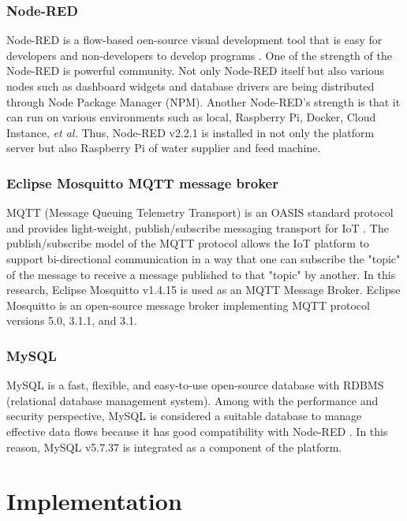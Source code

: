 \documentclass[conference]{IEEEtran}
\begin{document}
\subsubsection{Node-RED}
Node-RED is a flow-based oen-source visual development tool that is easy for developers and non-developers to develop programs \cite{b17}.
One of the strength of the Node-RED is powerful community. Not only Node-RED itself but also various nodes such as dashboard widgets and database drivers are being distributed through Node Package Manager (NPM).
Another Node-RED’s strength is that it can run on various environments such as local, Raspberry Pi, Docker, Cloud Instance, \textit{et al.} Thus, Node-RED v2.2.1 is installed in not only the platform server but also Raspberry Pi of water supplier and feed machine.

\subsubsection{Eclipse Mosquitto MQTT message broker}
MQTT (Message Queuing Telemetry Transport) is an OASIS standard protocol and provides light-weight, publish/subscribe messaging transport for IoT \cite{b9}.
The publish/subscribe model of the MQTT protocol allows the IoT platform to support bi-directional communication in a way that one can subscribe the "topic" of the message to receive a message published to that "topic" by another.
In this research, Eclipse Mosquitto v1.4.15 is used as an MQTT Message Broker.
Eclipse Mosquitto is an open-source message broker implementing MQTT protocol versions 5.0, 3.1.1, and 3.1\cite{b20}. 

\subsubsection{MySQL}
MySQL is a fast, flexible, and easy-to-use open-source database with RDBMS (relational database management system).
Among with the performance and security perspective, MySQL is considered a suitable database to manage effective data flows because it has good compatibility with Node-RED \cite{b21}.
In this reason, MySQL v5.7.37 is integrated as a component of the platform.

\section{Implementation}
\end{document}
